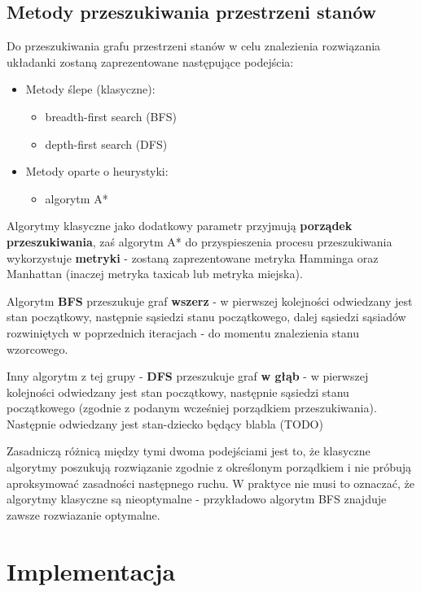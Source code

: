 \documentclass{classrep}
\begin{document}
\subsection{Metody przeszukiwania przestrzeni stanów}

Do przeszukiwania grafu przestrzeni stanów w celu znalezienia
rozwiązania układanki zostaną zaprezentowane następujące podejścia:

\begin{itemize}
\item
  Metody ślepe (klasyczne):

  \begin{itemize}
  \item
    breadth-first search (BFS)
  \item
    depth-first search (DFS)
  \end{itemize}
\item
  Metody oparte o heurystyki:

  \begin{itemize}
  \item
    algorytm A*
  \end{itemize}
\end{itemize}

Algorytmy klasyczne jako dodatkowy parametr przyjmują \textbf{porządek
przeszukiwania}, zaś algorytm A* do przyspieszenia procesu
przeszukiwania wykorzystuje \textbf{metryki} - zostaną zaprezentowane
metryka Hamminga oraz Manhattan (inaczej metryka taxicab lub metryka
miejska).

Algorytm \textbf{BFS} przeszukuje graf \textbf{wszerz} - w pierwszej
kolejności odwiedzany jest stan początkowy, następnie sąsiedzi stanu
początkowego, dalej sąsiedzi sąsiadów rozwiniętych w poprzednich
iteracjach - do momentu znalezienia stanu wzorcowego.

Inny algorytm z tej grupy - \textbf{DFS} przeszukuje graf \textbf{w
głąb} - w pierwszej kolejności odwiedzany jest stan początkowy,
następnie sąsiedzi stanu początkowego (zgodnie z podanym wcześniej
porządkiem przeszukiwania). Następnie odwiedzany jest stan-dziecko
będący blabla (TODO)

Zasadniczą różnicą między tymi dwoma podejściami jest to, że klasyczne
algorytmy poszukują rozwiązanie zgodnie z określonym porządkiem i nie
próbują aproksymować zasadności następnego ruchu. W praktyce nie musi to
oznaczać, że algorytmy klasyczne są nieoptymalne - przykładowo algorytm
BFS znajduje zawsze rozwiazanie optymalne.

\section{Implementacja}
\end{document}
